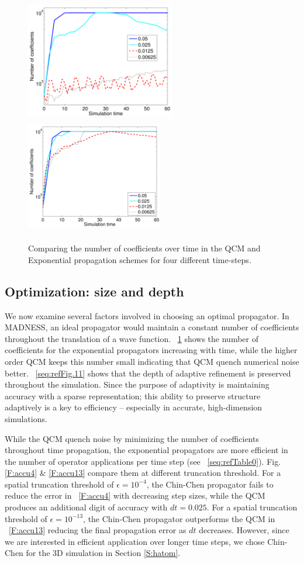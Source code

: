 \documentclass[review,letterpaper]{elsarticle}
\begin{document}
\begin{figure}[htbp]
\includegraphics[height=2in]{ncoeff1}
\includegraphics[width=2.35in,height=2.0in]{ncoeff2}
\caption{
Comparing the number of coefficients over time in the QCM and Exponential
propagation schemes for four different time-steps.
}
\label{F:errEnNorm}
\end{figure}


\subsection{Optimization: size and depth}
We now examine several factors involved in choosing an optimal propagator.
In MADNESS, an ideal propagator would maintain a constant number
of coefficients throughout the translation of a wave function.
\figurename~\ref{F:errEnNorm} shows the number of coefficients for the exponential
propagators increasing with time, while the higher order  QCM keeps this number small indicating that QCM
quench numerical noise better. \figurename~\ref{seq:refFig.11} shows that the depth of
adaptive refinement is preserved throughout the simulation.
Since the purpose of adaptivity is maintaining accuracy with a sparse representation;
this ability to preserve structure adaptively is a key to efficiency -- especially
in accurate, high-dimension simulations.

While the QCM quench noise by minimizing the number
of coefficients throughout time propagation, the exponential
propagators are more efficient in the number of operator applications per time
step (see \tablename~\ref{seq:refTable0}).
Fig. \ref{F:accu4} \& \ref{F:accu13} compare them at different truncation threshold.
For a spatial truncation threshold of $\epsilon=10^{-4}$, the Chin-Chen propagator
fails to reduce the error in  \figurename~\ref{F:accu4} with decreasing step sizes, while the QCM
produces an additional digit of accuracy with $dt=0.025$.
For a spatial truncation threshold of $\epsilon=10^{-13}$, the Chin-Chen propagator outperforms
the QCM in \figurename~\ref{F:accu13} reducing the final propagation error as $dt$ decreases.
However, since we are interested in efficient application over longer time steps,
we chose Chin-Chen for the 3D simulation \cite{Vence:2012iy} in Section \ref{S:hatom}.
\end{document}

